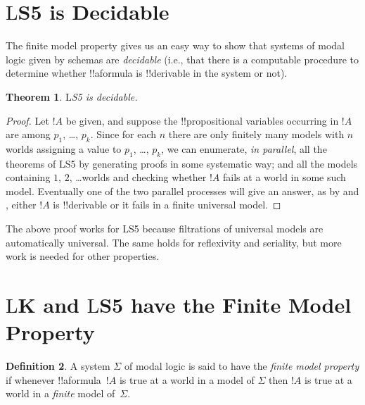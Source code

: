 \documentclass[10pt,a4paper]{article}
\makeatletter
\theoremstyle{plain}
\newtheorem{thm}{Theorem}[section]
\theoremstyle{definition}
\newtheorem{defn}[thm]{Definition}
\theoremstyle{remark}
\newcommand*{\olfileid}[3]{}
\newcommand*{\olsection}[1]{\section*{#1}}
\newcommand{\olref}{\@ifnextchar[{\olref@i}{\olref@final}}
\def\olref@i[#1]{\@ifnextchar[{\olref@ii}{\olref@final}}
\def\olref@ii[#1]{\@ifnextchar[{\olref@iii}{\olref@final}}
\def\olref@iii[#1]{\olref@final}
\def\olref@final#1{\ref{#1}}
\providecommand{\Log}{\ensuremath{\mathrm{L}}}
\makeatother
\begin{document}



\olfileid{nml}{fil}{dec}

\olsection{\Log{S5} is Decidable}
The finite model property gives us an easy way to show that systems of
modal logic given by schemas are \emph{decidable} (i.e., that there is
a computable procedure to determine whether !!a{formula} is !!{derivable} in
the system or not).

\begin{thm}
  \Log{S5} is decidable.
\end{thm}

\begin{proof}
  Let $!A$ be given, and suppose the !!{propositional variable}s
  occurring in $!A$ are among $p_1$, \dots, $p_k$.  Since for each
  $n$ there are only finitely many models with $n$ worlds assigning a
  value to $p_1$, \dots, $p_k$, we can enumerate, \emph{in parallel}, all
  the theorems of \Log{S5} by generating proofs in some systematic
  way; and all the models containing $1$, $2$, \dots worlds and checking
  whether $!A$ fails at a world in some such model. Eventually
  one of the two parallel processes will give an answer, as by
  \olref[com][fra]{thm:generaldet} and \olref[fmp]{cor:S5fmp}, either
  $!A$ is !!{derivable} or it fails in a finite universal model.
\end{proof}

The above proof works for \Log{S5} because filtrations of universal
models are automatically universal. The same holds for reflexivity and
seriality, but more work is needed for other properties.





\olfileid{nml}{fil}{fmp}

\olsection{\Log{K} and \Log{S5} have the Finite Model Property}

\begin{defn}
  A system $\Sigma$ of modal logic is said to have the \emph{finite
    model property} if whenever !!a{formula}~$!A$ is true at a world
  in a model of $\Sigma$ then $!A$ is true at a world in a
  \emph{finite} model of~$\Sigma$.
\end{defn}
\end{document}
